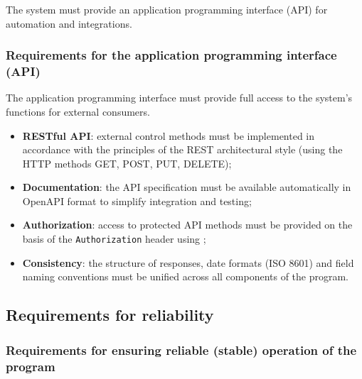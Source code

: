 \documentclass[12pt,a4paper]{extarticle}
\begin{document}
\begin{hseExample}
The system must provide an application programming interface (API) for automation and integrations.
\end{hseExample}

\subsubsection{Requirements for the application programming interface (API)}

\begin{hseExample}
The application programming interface must provide full access to the system's functions for external consumers.
\begin{itemize}[nosep, leftmargin=1.25cm]
    \item \textbf{RESTful API}: external control methods must be implemented in accordance with the principles of the REST architectural style (using the HTTP methods GET, POST, PUT, DELETE);
    \item \textbf{Documentation}: the API specification must be available automatically in OpenAPI format to simplify integration and testing;
    \item \textbf{Authorization}: access to protected API methods must be provided on the basis of the \texttt{Authorization} header using ;
    \item \textbf{Consistency}: the structure of responses, date formats (ISO 8601) and field naming conventions must be unified across all components of the program.
\end{itemize}
\end{hseExample}

\subsection{Requirements for reliability}

\subsubsection{Requirements for ensuring reliable (stable) operation of the program}
\end{document}

